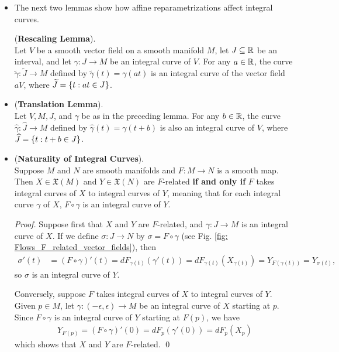 \documentclass[11pt]{article}
\begin{document}
\begin{itemize}
\item The next two lemmas show how affine reparametrizations affect integral curves.
\begin{lemma} (\textbf{Rescaling Lemma}). \citep{lee2003introduction}\\
Let $V$ be a smooth vector field on a smooth manifold $M$, let $J \subseteq {\mathbb R}$ be an interval, and let $\gamma: J \rightarrow M$ be an integral curve of $V$. For any $a \in {\mathbb R}$, the curve $\widetilde{\gamma}: \widetilde{J} \rightarrow M$ defined by $\widetilde{\gamma}(t) =  \gamma(at)$ is an integral curve of the vector field $aV$, where $\widetilde{J} = \left\{t: at \in J\right\}$. 
\end{lemma}

\item \begin{lemma} (\textbf{Translation Lemma}).  \citep{lee2003introduction}\\
Let $V, M, J$, and $\gamma$ be as in the preceding lemma. For any $b \in {\mathbb R}$, the curve $\widehat{\gamma}:  \widehat{J} \rightarrow M$ defined by $\widehat{\gamma}(t) =  \gamma(t + b)$ is also an integral curve of $V$, where $ \widehat{J} = \left\{t: t + b \in J\right\}$.
\end{lemma}

\item \begin{proposition} (\textbf{Naturality of Integral Curves}).  \citep{lee2003introduction}\\
Suppose $M$ and $N$ are smooth manifolds and $F: M \rightarrow N$ is a smooth map. Then $X \in \mathfrak{X}(M)$ and $Y \in \mathfrak{X}(N)$ are $F$-related \textbf{if and only if} $F$ takes integral curves of $X$ to integral curves of $Y$, meaning that for each integral curve $\gamma$ of $X$,  $F \circ \gamma$ is an integral curve of $Y$.
\end{proposition}
\begin{proof}
Suppose first that $X$ and $Y$ are $F$-related, and $\gamma:  J \rightarrow M$ is an integral curve of $X$. If we define $\sigma: J \rightarrow N$ by $\sigma = F \circ \gamma$ (see Fig. \ref{fig: Flows_F_related_vector_fields}), then
\begin{align*}
\sigma'(t) &= (F \circ \gamma)'(t) =  dF_{\gamma(t)}(\gamma'(t)) = dF_{\gamma(t)}(X_{\gamma(t)}) = Y_{F(\gamma(t))} = Y_{\sigma(t)},
\end{align*} so $\sigma$ is an integral curve of $Y$.

Conversely, suppose $F$ takes integral curves of $X$ to integral curves of $Y$. Given $p \in M$, let  $\gamma: (-\epsilon, \epsilon) \rightarrow M$ be an integral curve of $X$ starting at $p$. Since $F \circ \gamma$ is an integral curve of $Y$ starting at $F(p)$,  we have
\begin{align*}
Y_{F(p)} = (F \circ \gamma)'(0) = dF_{p}(\gamma'(0)) = dF_{p}(X _{p})
\end{align*} which shows that $X$ and $Y$ are $F$-related. \qed
\end{proof}
\end{itemize}
\end{document}
